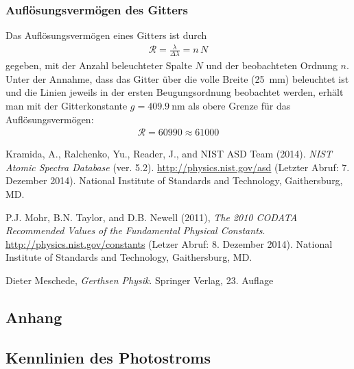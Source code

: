 \documentclass[11pt, a4paper]{article}
\numberwithin{equation}{section}
\begin{document}
\subsubsection{Auflösungsvermögen des Gitters}
Das Auflösungsvermögen eines Gitters ist durch
\begin{align*}
\mathcal{R}=\frac{\lambda}{\Delta\lambda}=n\,N
\end{align*}
gegeben, mit der Anzahl beleuchteter Spalte $N$ und der beobachteten Ordnung $n$. Unter der Annahme, dass das Gitter über die volle Breite (\SI{25}{\milli\metre}) beleuchtet ist und die Linien jeweils in der ersten Beugungsordnung beobachtet werden, erhält man mit der Gitterkonstante $g=\SI{409.9}{\nano\metre}$ als obere Grenze für das Auflösungsvermögen:
\begin{align*}
\mathcal{R}=60990\approx 61000
\end{align*}


\begin{thebibliography}{9}

	Kramida, A., Ralchenko, Yu., Reader, J., and NIST ASD Team (2014).
	\emph{NIST Atomic Spectra Database} (ver. 5.2).
	\url{http://physics.nist.gov/asd} (Letzter Abruf: 7. Dezember 2014).
	National Institute of Standards and Technology, Gaithersburg, MD.

	P.J. Mohr, B.N. Taylor, and D.B. Newell (2011),
	\emph{The 2010 CODATA Recommended Values of the Fundamental Physical Constants}.
	\url{http://physics.nist.gov/constants} (Letzer Abruf: 8. Dezember 2014).
	National Institute of Standards and Technology, Gaithersburg, MD.
	
	Dieter Meschede,
	\emph{Gerthsen Physik}.
	Springer Verlag,
	23. Auflage
 
\end{thebibliography}

\begin{appendix}
\section{Anhang}
\subsection{Kennlinien des Photostroms}
\label{app:kennlinien}
\FloatBarrier


\end{appendix}
\end{document}
